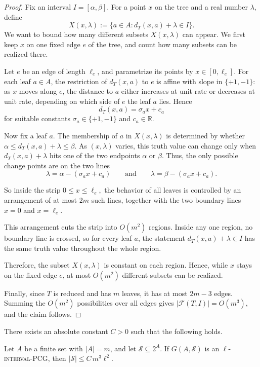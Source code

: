 \documentclass[a4paper,UKenglish,cleveref,autoref,thm-restate]{socg-lipics-v2021}
\begin{document}
\begin{proof}
Fix an interval \(I=[\alpha,\beta]\). For a point \(x\) on the tree and a real number \(\lambda\), define
\[
X(x,\lambda):=\{a\in A: d_T(x,a)+\lambda\in I\}.
\]
We want to bound how many different subsets \(X(x,\lambda)\) can appear. We first keep \(x\) on one fixed edge \(e\) of the tree, and count how many subsets can be realized there.

Let \(e\) be an edge of length \(\ell_e\), and parametrize its points by
\(x\in[0,\ell_e]\). For each leaf \(a\in A\), the restriction of \(d_T(x,a)\) to \(e\)
is affine with slope in \(\{+1,-1\}\): as \(x\) moves along \(e\), the distance to \(a\)
either increases at unit rate or decreases at unit rate, depending on which side of \(e\)
the leaf \(a\) lies. Hence
\[
d_T(x,a)=\sigma_a x+c_a
\]
for suitable constants \(\sigma_a\in\{+1,-1\}\) and \(c_a\in\mathbb R\).

Now fix a leaf \(a\). The membership of \(a\) in \(X(x,\lambda)\) is determined by whether
\(
\alpha \le d_T(x,a)+\lambda \le \beta.
\)
As \((x,\lambda)\) varies, this truth value can change only when
\(d_T(x,a)+\lambda\) hits one of the two endpoints \(\alpha\) or \(\beta\). Thus, the only
possible change points are on the two lines
\[
\lambda=\alpha-(\sigma_a x+c_a)
\qquad\text{and}\qquad
\lambda=\beta-(\sigma_a x+c_a).
\]

So inside the strip
\(
0\le x\le \ell_e,
\)
the behavior of all leaves is controlled by an arrangement of at most \(2m\) such lines,
together with the two boundary lines \(x=0\) and \(x=\ell_e\).

This arrangement cuts the strip into \(O(m^2)\) regions. Inside any one region, no boundary
line is crossed, so for every leaf \(a\), the statement
\(
d_T(x,a)+\lambda\in I
\)
has the same truth value throughout the whole region. 

Therefore, the subset \(X(x,\lambda)\)
is constant on each region. Hence, while \(x\) stays on the fixed edge \(e\), at most \(O(m^2)\) different subsets can
be realized.

Finally, since \(T\) is reduced and has \(m\) leaves, it has at most \(2m-3\) edges.
Summing the \(O(m^2)\) possibilities over all edges gives
\(
|\mathcal F(T,I)|=O(m^3)
\), and the claim follows.
\end{proof}

\begin{proposition}\label{prop:interval-set-system_app}
There exists an absolute constant \(C>0\) such that the following holds.

Let \(A\) be a finite set with \(|A|=m\), and let \(\mathcal S\subseteq 2^A\). If
\(G(A,\mathcal S)\) is an \textsc{$\ell$-interval-\textsc{PCG}}, then
\(
|\mathcal S|\le C\,m^3\ell^2.
\)
\end{proposition}
\end{document}
